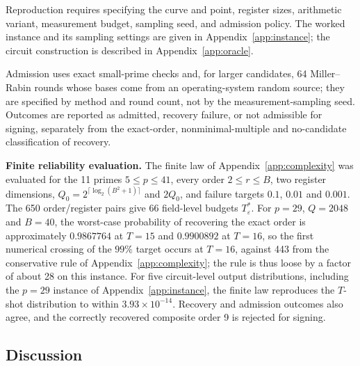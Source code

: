 \begin{revision}
Reproduction requires specifying the curve and point, register sizes, arithmetic variant, measurement budget, sampling seed, and admission policy. The worked instance and its sampling settings are given in Appendix~\ref{app:instance}; the circuit construction is described in Appendix~\ref{app:oracle}.

Admission uses exact small-prime checks and, for larger candidates, 64 Miller--Rabin rounds whose bases come from an operating-system random source; they are specified by method and round count, not by the measurement-sampling seed. Outcomes are reported as admitted, recovery failure, or not admissible for signing, separately from the exact-order, nonminimal-multiple and no-candidate classification of recovery.

\textbf{Finite reliability evaluation.}
The finite law of Appendix~\ref{app:complexity} was evaluated for the 11 primes $5\leq p\leq 41$, every order $2\leq r\leq B$, two register dimensions, $Q_0=2^{\lceil\log_2(B^2+1)\rceil}$ and $2Q_0$, and failure targets $0.1$, $0.01$ and $0.001$. The 650 order/register pairs give 66 field-level budgets $T_\varepsilon^*$. For $p=29$, $Q=2048$ and $B=40$, the worst-case probability of recovering the exact order is approximately $0.9867764$ at $T=15$ and $0.9900892$ at $T=16$, so the first numerical crossing of the $99\%$ target occurs at $T=16$, against 443 from the conservative rule of Appendix~\ref{app:complexity}; the rule is thus loose by a factor of about 28 on this instance. For five circuit-level output distributions, including the $p=29$ instance of Appendix~\ref{app:instance}, the finite law reproduces the $T$-shot distribution to within $3.93\times10^{-14}$. Recovery and admission outcomes also agree, and the correctly recovered composite order 9 is rejected for signing.
\end{revision}

\subsection{Discussion}\label{sec:discussion}

